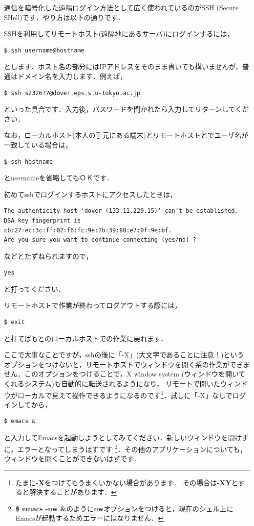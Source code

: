 \documentclass{jarticle}
\begin{document}
通信を暗号化した遠隔ログイン方法として広く使われているのがSSH  (Secure SHell)です．やり方は以下の通りです．

SSHを利用してリモートホスト(遠隔地にあるサーバ)にログインするには，
\begin{verbatim}
$ ssh username@hostname
\end{verbatim}
とします．ホスト名の部分にはIPアドレスをそのまま書いても構いませんが，普通はドメイン名を入力します．例えば，
\begin{verbatim}
$ ssh s2326??@dover.eps.s.u-tokyo.ac.jp
\end{verbatim}
といった具合です．入力後，パスワードを聞かれたら入力してリターンしてください．

なお，ローカルホスト(本人の手元にある端末)とリモートホストとでユーザ名が一致している場合は，
\begin{verbatim}
$ ssh hostname
\end{verbatim}
とusernameを省略してもＯＫです．

初めてsshでログインするホストにアクセスしたときは，
\begin{Verbatim}[baselinestretch=0.5]
The authenticity host ‘dover (133.11.229.15)’ can’t be established.
DSA key fingerprint is cb:27:ec:3c:ff:02:f6:fc:9e:7b:39:80:e7:0f:9e:bf.
Are you sure you want to continue connecting (yes/no) ?
\end{Verbatim}
などとたずねられますので，
\begin{verbatim}
yes 
\end{verbatim}
と打ってください．

リモートホストで作業が終わってログアウトする際には，
\begin{verbatim}
$ exit
\end{verbatim}
と打てばもとのローカルホストでの作業に戻れます．

ここで大事なことですが，sshの後に「-X」(大文字であることに注意！)というオプションをつけないと，リモートホストでウィンドウを開く系の作業ができません．このオプションをつけることで，X window system (ウィンドウを開いてくれるシステム)も自動的に転送されるようになり，
リモートで開いたウィンドウがローカルで見えて操作できるようになるのです\footnote{たまに{\bf -X}をつけてもうまくいかない場合があります．
その場合は{\bf -XY}とすると解決することがあります．}．試しに「-X」なしでログインしてから，
\begin{verbatim}
$ emacs &
\end{verbatim}
と入力してEmacsを起動しようとしてみてください．新しいウィンドウを開けずに，エラーとなってしまうはずです
\footnote{{\bf \$ emacs -nw \&}のように{\bf nw}オプションをつけると，現在のシェル上にEmacsが起動するためエラーにはなりません．}．その他のアプリケーションについても，ウィンドウを開くことができないはずです．
\end{document}
